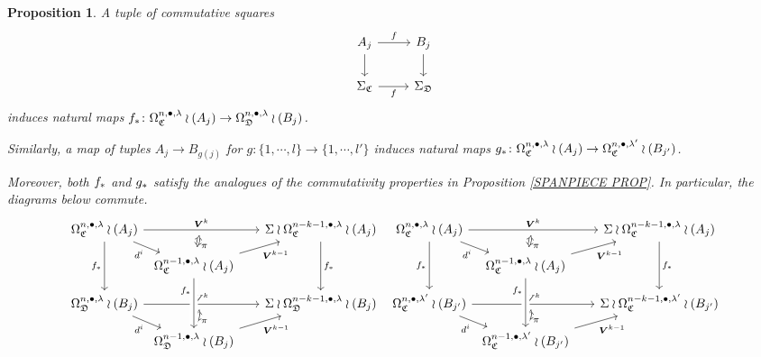 \documentclass[a4paper,10pt
,draft
]{article}%
\numberwithin{equation}{section}
\numberwithin{figure}{section}
\newtheorem{proposition}[equation]{Proposition}%
\theoremstyle{definition} %
\newcommand{\1}{\ensuremath{\mathbbm 1}}%
\begin{document}
\begin{proposition}\label{SPANPIECEJ PROP}
A tuple of commutative squares
\begin{equation}\label{SPANPIECEJ EQ}
\begin{tikzcd}
	A_j \ar{d} \ar{r}{f} &  \ar{d} B_j
\\
	\Sigma_{\mathfrak{C}} \ar{r}[swap]{f} & \Sigma_{\mathfrak{D}}
\end{tikzcd}
\end{equation}
induces natural maps 
$f_{\**} \colon
\Omega_{\mathfrak{C}}^{n,\bullet,\lambda} \wr (A_j) \to 
\Omega_{\mathfrak{D}}^{n,\bullet,\lambda} \wr (B_j) $.

Similarly, a map of tuples $A_j \to B_{g(j)}$ for 
$g \colon \{1,\cdots,l\} \to \{1,\cdots,l'\}$
induces natural maps 
$g_{\**} \colon
\Omega_{\mathfrak{C}}^{n,\bullet,\lambda} \wr (A_j) \to 
\Omega_{\mathfrak{C}}^{n,\bullet,\lambda'} \wr (B_{j'}) $.

Moreover, both $f_{\**}$ and $g_{\**}$ satisfy the analogues of the commutativity properties in Proposition \ref{SPANPIECE PROP}.
In particular, the diagrams below commute.
\[
\begin{tikzcd}[column sep = 4pt, row sep = small]
	\Omega^{n,\bullet,\lambda}_{\mathfrak{C}} \wr (A_j)
	\ar{rrrrr}[name=toE]{\boldsymbol{V}^k} \ar{rd}[swap]{d^i} \ar{dd}[swap]{f_{\**}}
	&&&
	&&
	\Sigma \wr \Omega^{n-k-1,\bullet,\lambda}_{\mathfrak{C}} \wr (A_j) \ar{dd}{f_{\**}}
&
	\Omega^{n,\bullet,\lambda}_{\mathfrak{C}} \wr (A_j)
	\ar{rrrrr}[name=toE2]{\boldsymbol{V}^k} \ar{rd}[swap]{d^i} \ar{dd}[swap]{f_{\**}}
	&&&
	&&
	\Sigma \wr \Omega^{n-k-1,\bullet,\lambda}_{\mathfrak{C}} \wr (A_j) \ar{dd}{f_{\**}}
\\
	&
	|[alias=DBE]|
	\Omega^{n-1,\bullet,\lambda}_{\mathfrak{C}} \wr (A_j) \ar{rrrru}[swap]{\boldsymbol{V}^{k-1}}
	&&&&
&
	&
	|[alias=DBE2]|
	\Omega^{n-1,\bullet,\lambda}_{\mathfrak{C}} \wr (A_j) \ar{rrrru}[swap]{\boldsymbol{V}^{k-1}}
\\
	\Omega^{n,\bullet,\lambda}_{\mathfrak{D}} \wr (B_j) \ar{rrrrr}[name=toB]{\boldsymbol{V}^k} \ar{rd}[swap]{d^i}
	&&&
	&&
	\Sigma \wr \Omega^{n-k-1,\bullet,\lambda}_{\mathfrak{D}} \wr (B_j)
&
	\Omega^{n,\bullet,\lambda'}_{\mathfrak{C}} \wr (B_{j'}) \ar{rrrrr}[name=toB2]{\boldsymbol{V}^k} \ar{rd}[swap]{d^i}
	&&&
	&&
	\Sigma \wr \Omega^{n-k-1,\bullet,\lambda'}_{\mathfrak{C}} \wr (B_{j'})
\\
	&
	|[alias=D]| \Omega^{n-1,\bullet,\lambda}_{\mathfrak{D}} \wr (B_j) \ar{rrrru}[swap]{\boldsymbol{V}^{k-1}}
	&&&&
&
	&
	|[alias=D2]| \Omega^{n-1,\bullet,\lambda'}_{\mathfrak{C}} \wr (B_{j'}) \ar{rrrru}[swap]{\boldsymbol{V}^{k-1}}
\arrow[Leftrightarrow, from=DBE, to=toE, shorten <=0.15cm,shorten >=0.15cm
,swap,"\pi"
]
	\arrow[Leftrightarrow, from=D, to=toB, shorten <=0.15cm,shorten >=0.15cm,swap,"\pi"]
	\arrow[from=DBE, to=D, crossing over, near start, swap, "f_{\**}"]
\arrow[Leftrightarrow, from=DBE2, to=toE2, shorten <=0.15cm,shorten >=0.15cm
,swap,"\pi"
]
	\arrow[Leftrightarrow, from=D2, to=toB2, shorten <=0.15cm,shorten >=0.15cm,swap,"\pi"]
	\arrow[from=DBE2, to=D2, crossing over, near start, swap, "f_{\**}"]
\end{tikzcd}
\]
\end{proposition}
\end{document}

